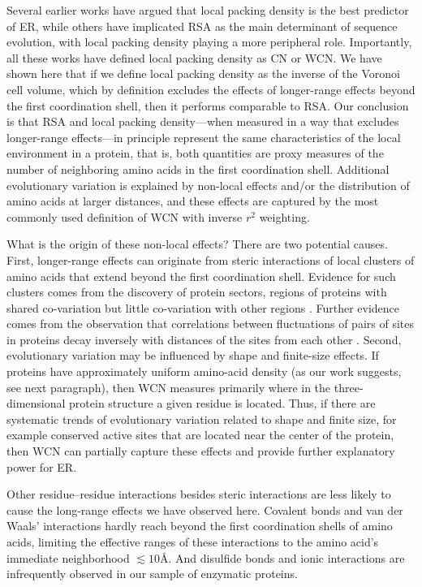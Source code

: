 \documentclass[12pt]{article}
\begin{document}
    Several earlier works \cite{yeh_local_2014, huang_mechanistic_2014} have argued that local packing density is the best predictor of ER, while others \cite{franzosa_structural_2009, shahmoradi_predicting_2014} have implicated RSA as the main determinant of sequence evolution, with local packing density playing a more  peripheral role. Importantly, all these works have defined local packing density as CN or WCN. We have shown here that if we define local packing density as the inverse of the Voronoi cell volume, which by definition excludes the effects of longer-range effects beyond the first coordination shell, then it performs comparable to RSA.  Our conclusion is that RSA and local packing density---when measured in a way that excludes longer-range effects---in principle represent the same characteristics of the local environment in a protein, that is, both quantities are proxy measures of the number of neighboring amino acids in the first coordination shell. Additional evolutionary variation is explained by non-local effects and/or the distribution of amino acids at larger distances, and these effects are captured by the most commonly used definition of WCN with inverse $r^2$ weighting.
        
What is the origin of these non-local effects? There are two potential causes. First, longer-range effects can originate from steric interactions of local clusters of amino acids that extend beyond the first coordination shell. Evidence for such clusters comes from the discovery of protein sectors, regions of proteins with shared co-variation but little co-variation with other regions \cite{Halabietal2009}. Further evidence comes from the observation that correlations between fluctuations of pairs of sites in proteins decay inversely with distances of the sites from each other \cite{dehouck_effective_2013}. Second, evolutionary variation may be influenced by shape and finite-size effects. If proteins have approximately uniform amino-acid density (as our work suggests, see next paragraph), then WCN measures primarily where in the three-dimensional protein structure a given residue is located. Thus, if there are systematic trends of evolutionary variation related to shape and finite size, for example conserved active sites that are located near the center of the protein, then WCN can partially capture these effects and provide further explanatory power for ER.

Other residue--residue interactions besides steric interactions are less likely to cause the long-range effects we have observed here. Covalent bonds and van der Waals' interactions hardly reach beyond the first coordination shells of amino acids, limiting the effective ranges of these interactions to the amino acid's immediate neighborhood $\lesssim10$\AA. And disulfide bonds and ionic interactions are infrequently observed in our sample of enzymatic proteins.
\end{document}
